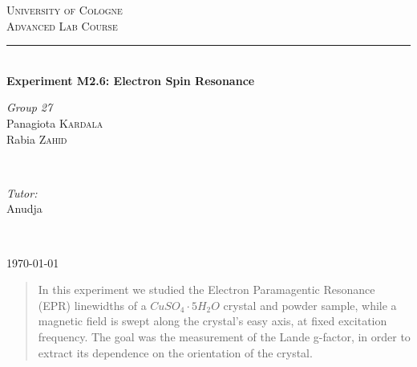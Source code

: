 \documentclass[openany,11pt,a4paper]{report}
\begin{document}
\pagestyle{empty}


\begin{titlepage}

\newcommand{\HRule}{\rule{\linewidth}{0.5mm}} 
\center 

\textsc{\LARGE University of Cologne}\\[1.5cm]
\textsc{\Large Advanced Lab Course}\\[0.5cm] 

\vfill


\HRule \\[0.4cm]
{\huge \textbf {Experiment M2.6: Electron Spin Resonance}}

 
\vfill

\begin{minipage}{0.4\textwidth}
\begin{flushleft} \large
\emph{Group 27}\\
Panagiota \textsc{Kardala}\\
Rabia \textsc{Zahid} 
\end{flushleft}
\end{minipage}
~
\begin{minipage}{0.4\textwidth}
\begin{flushright} \large
\emph{Tutor:} \\
{Anudja } 
\end{flushright}
\end{minipage}\\[4cm]


\vfill

{\large \today}\\[3cm] 

\vfill

\end{titlepage}



\pagestyle{plain}

\tableofcontents







\begin{abstract}
In this experiment we studied the Electron Paramagentic Resonance (EPR) linewidths of a $CuSO_{4}\cdot 5H_{2}O$ crystal and powder sample, while a magnetic field is swept along the crystal's easy axis, at fixed excitation frequency. The goal was the measurement of the Lande g-factor, in order to extract its dependence on the orientation of the crystal. 
\end{abstract}
\end{document}
